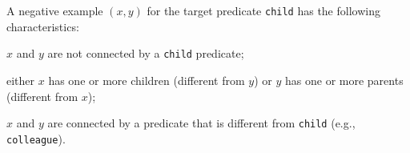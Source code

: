 %
%
\begin{example}
	A negative example $(x,y)$ for the target predicate \texttt{child} has the following characteristics:
	\begin{inparaenum}[\itshape(i)]
		\item $x$ and $y$ are not connected by a \texttt{child} predicate;
		\item either $x$ has one or more children (different from $y$) or $y$ has one or more parents (different from $x$);
		\item $x$ and $y$ are connected by a predicate that is different from \texttt{child} (e.g., \texttt{colleague}).
	\end{inparaenum}
\end{example}

